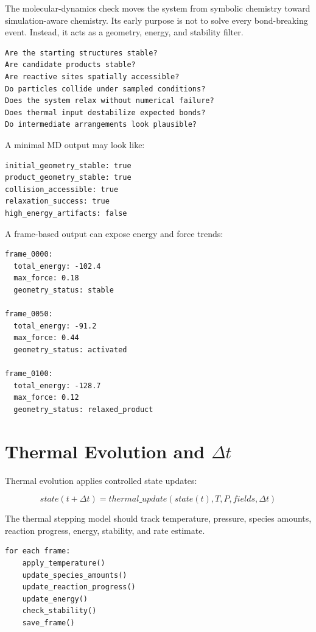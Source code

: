 \documentclass[11pt]{article}
\begin{document}
The molecular-dynamics check moves the system from symbolic chemistry toward simulation-aware chemistry. Its early purpose is not to solve every bond-breaking event. Instead, it acts as a geometry, energy, and stability filter.

\begin{lstlisting}[caption={MD plausibility questions}]
Are the starting structures stable?
Are candidate products stable?
Are reactive sites spatially accessible?
Do particles collide under sampled conditions?
Does the system relax without numerical failure?
Does thermal input destabilize expected bonds?
Do intermediate arrangements look plausible?
\end{lstlisting}

A minimal MD output may look like:

\begin{lstlisting}[caption={Example MD validation output}]
initial_geometry_stable: true
product_geometry_stable: true
collision_accessible: true
relaxation_success: true
high_energy_artifacts: false
\end{lstlisting}

A frame-based output can expose energy and force trends:

\begin{lstlisting}[caption={Example frame-based MD output}]
frame_0000:
  total_energy: -102.4
  max_force: 0.18
  geometry_status: stable

frame_0050:
  total_energy: -91.2
  max_force: 0.44
  geometry_status: activated

frame_0100:
  total_energy: -128.7
  max_force: 0.12
  geometry_status: relaxed_product
\end{lstlisting}

\section{Thermal Evolution and \texorpdfstring{$\Delta t$}{delta-t}}

Thermal evolution applies controlled state updates:

\[
state(t + \Delta t) = thermal\_update(state(t), T, P, fields, \Delta t)
\]

The thermal stepping model should track temperature, pressure, species amounts, reaction progress, energy, stability, and rate estimate.

\begin{lstlisting}[caption={Thermal stepping loop}]
for each frame:
    apply_temperature()
    update_species_amounts()
    update_reaction_progress()
    update_energy()
    check_stability()
    save_frame()
\end{lstlisting}
\end{document}
